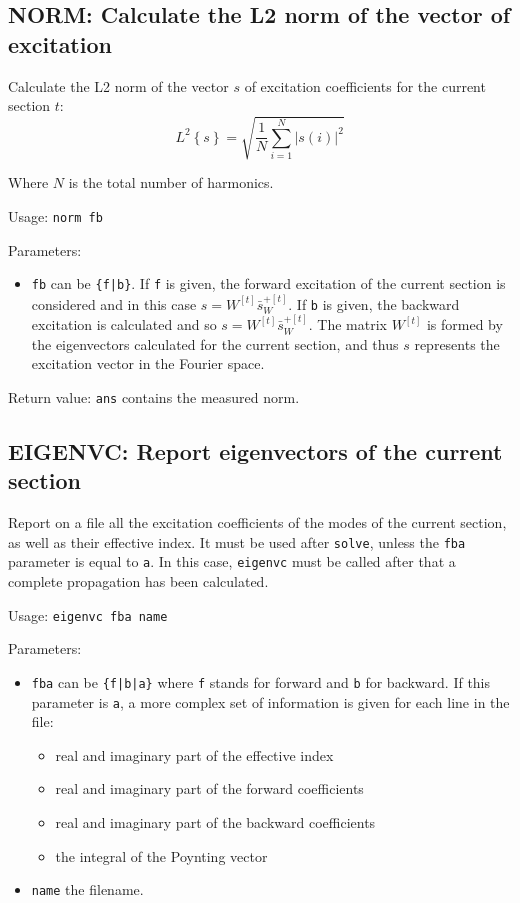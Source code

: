 \subsection{NORM: Calculate the L2 norm of the vector of excitation}
    Calculate the L2 norm of the vector $s$ of excitation coefficients for
    the current section $t$:
    \begin{equation}
        L^{2}\left\{s\right\}=\sqrt{\frac{1}{N}\sum_{i=1}^N\left | s(i)\right|^2}
    \end{equation}
    
    Where $N$ is the total number of harmonics.
    
    Usage: \lstinline!norm fb!
    
    Parameters:
    \begin{itemize}
    \item \lstinline!fb! can be \lstinline!{f|b}!. If \lstinline!f! is given, the forward excitation of the current section is considered and in this case $s=W^{[t]} \bar{s}_{W}^{+[t]}$. If \lstinline!b! is given, the backward excitation is calculated and so $s=W^{[t]} \bar{s}_{W}^{+{[t]}}$. The matrix $W^{[t]}$ is formed by the eigenvectors calculated for the current section, and thus $s$ represents the excitation vector in the Fourier space.
    \end{itemize}
    
    Return value: \lstinline!ans! contains the measured norm.  
    
\subsection{EIGENVC: Report eigenvectors of the current section}
    Report on a file all the excitation coefficients of the modes of the current section, as well as their effective index. It must be used after \lstinline!solve!, unless the \lstinline!fba! parameter is equal to \lstinline!a!. In this case, \lstinline!eigenvc! must be called after that a complete propagation has been calculated.
    
    Usage:  \lstinline!eigenvc fba name!
    
    Parameters:
    \begin{itemize}
    \item \lstinline!fba! can be \lstinline!{f|b|a}! where \lstinline!f! stands for forward and \lstinline!b! for backward. If this parameter is \lstinline!a!, a more complex set of   information is given for each line in the file:
    \begin{itemize}
    \item real and imaginary part of the effective index
    \item real and imaginary part of the forward coefficients
    \item real and imaginary part of the backward coefficients 
    \item the integral of the Poynting vector
    \end{itemize}
    \item \lstinline!name! the filename.
    \end{itemize}


